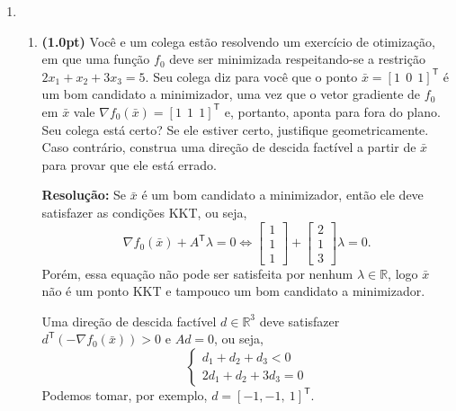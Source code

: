 \documentclass{article}
\newcommand{\R}{\mathbb{R}}
\newcommand{\T}{\mathsf{T}}
\begin{document}
\begin{enumerate}[resume*=exerc]
\item

\begin{enumerate}[label=(\alph*),series=q4]
\item {\bf (1.0pt)} Você e um colega estão resolvendo um exercício de otimização, em que uma função $f_0$ deve ser minimizada respeitando-se a restrição $2x_1 + x_2 + 3x_3 = 5$. Seu colega diz para você que o ponto $\bar x = [1~~0~~1]^\T$ é um bom candidato a minimizador, uma vez que o vetor gradiente de $f_0$ em $\bar x$ vale $\nabla f_0(\bar x) = [1~~1~~1]^\T$ e, portanto, aponta para fora do plano. Seu colega está certo? Se ele estiver certo, justifique geometricamente. Caso contrário, construa uma direção de descida factível a partir de $\bar x$ para provar que ele está errado.
\begin{framed}
{\bf Resolução:}
Se $\bar x$ é um bom candidato a minimizador, então ele deve satisfazer as condições KKT, ou seja,
\[
    \nabla f_0(\bar x) + A^\T\lambda = 0
    \Leftrightarrow
    \begin{bmatrix} 1\\ 1\\ 1 \end{bmatrix} + \begin{bmatrix} 2\\ 1\\ 3 \end{bmatrix}\lambda = 0.
\]
Porém, essa equação não pode ser satisfeita por nenhum $\lambda\in\R$, logo $\bar x$ não é um ponto KKT e tampouco um bom candidato a minimizador.

Uma direção de descida factível $d\in\R^3$ deve satisfazer $d^\T (-\nabla f_0(\bar x)) > 0$ e $A d = 0$, ou seja,
\[
\left\{ \begin{array}{rl}
d_1 + d_2 + d_3 < 0\\
2 d_1 + d_2 + 3d_3 = 0\end{array} \right.
\]
Podemos tomar, por exemplo, $d = [-1, -1, ~1]^\T$.
\vspace{1cm}
\end{framed}


\end{enumerate}
\end{enumerate}
\end{document}

